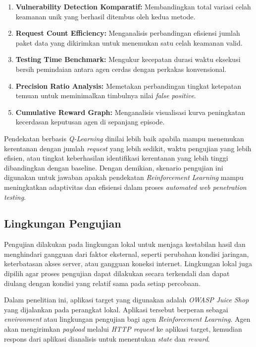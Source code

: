 \begin{enumerate}
    \item \textbf{Vulnerability Detection Komparatif:} Membandingkan total variasi celah keamanan unik yang berhasil ditembus oleh kedua metode.
    \item \textbf{Request Count Efficiency:} Menganalisis perbandingan efisiensi jumlah paket data yang dikirimkan untuk menemukan satu celah keamanan valid.
    \item \textbf{Testing Time Benchmark:} Mengukur kecepatan durasi waktu eksekusi bersih pemindaian antara agen cerdas dengan perkakas konvensional.
    \item \textbf{Precision Ratio Analysis:} Memetakan perbandingan tingkat ketepatan temuan untuk meminimalkan timbulnya nilai \textit{false positive}.
    \item \textbf{Cumulative Reward Graph:} Menganalisis visualisasi kurva peningkatan kecerdasan keputusan agen di sepanjang episode.
\end{enumerate}

Pendekatan berbasis \textit{Q-Learning} dinilai lebih baik apabila mampu menemukan kerentanan dengan jumlah \textit{request} yang lebih sedikit, waktu pengujian yang lebih efisien, atau tingkat keberhasilan identifikasi kerentanan yang lebih tinggi dibandingkan dengan baseline. Dengan demikian, skenario pengujian ini digunakan untuk jawaban apakah pendekatan \textit{Reinforcement Learning} mampu meningkatkan adaptivitas dan efisiensi dalam proses \textit{automated web penetration testing}.

\subsection{Lingkungan Pengujian}

Pengujian dilakukan pada lingkungan lokal untuk menjaga kestabilan hasil dan menghindari gangguan dari faktor eksternal, seperti perubahan kondisi jaringan, keterbatasan akses server, atau gangguan koneksi internet. Lingkungan lokal juga dipilih agar proses pengujian dapat dilakukan secara terkendali dan dapat diulang dengan kondisi yang relatif sama pada setiap percobaan.

Dalam penelitian ini, aplikasi target yang digunakan adalah \textit{OWASP Juice Shop} yang dijalankan pada perangkat lokal. Aplikasi tersebut berperan sebagai \textit{environment} atau lingkungan pengujian bagi agen \textit{Reinforcement Learning}. Agen akan mengirimkan \textit{payload} melalui \textit{HTTP request} ke aplikasi target, kemudian respons dari aplikasi dianalisis untuk menentukan \textit{state} dan \textit{reward}.

